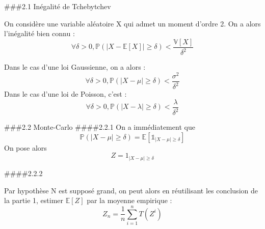 \documentclass[]{article}
\begin{document}
\#\#\#2.1 Inégalité de Tchebytchev

On considère une variable aléatoire X qui admet un moment d'ordre 2. On
a alors l'inégalité bien connu :
\[\forall \delta > 0, \mathbb{P}(|X-\mathbb{E}[X]|\geq\delta)<\frac{\mathbb{V}[X]}{\delta^{2}}\]

Dans le cas d'une loi Gaussienne, on a alors :
\[\forall \delta > 0, \mathbb{P}(|X-\mu|\geq \delta)<\frac{\sigma^{2}}{\delta^{2}}\]
Dans le cas d'une loi de Poisson, c'est :
\[\forall \delta >0, \mathbb{P}(|X-\lambda|\geq \delta)<\frac{\lambda}{\delta^{2}}\]

\#\#\#2.2 Monte-Carlo \#\#\#\#2.2.1 On a immédiatement que
\[\mathbb{P}(|X-\mu|\geq\delta)=\mathbb{E}[\mathbb{1}_{|X-\mu|\geq\delta}]\]
On pose alors \[Z=1_{|X-\mu|\geq\delta}\]

\#\#\#\#2.2.2

Par hypothèse N est supposé grand, on peut alors en réutilisant les
conclusion de la partie 1, estimer \(\mathbb{E}[Z]\) par la moyenne
empirique : \[Z_{n}= \frac{1}{n}\sum\limits_{i=1}^{n}T(Z^{i})\]
\end{document}
